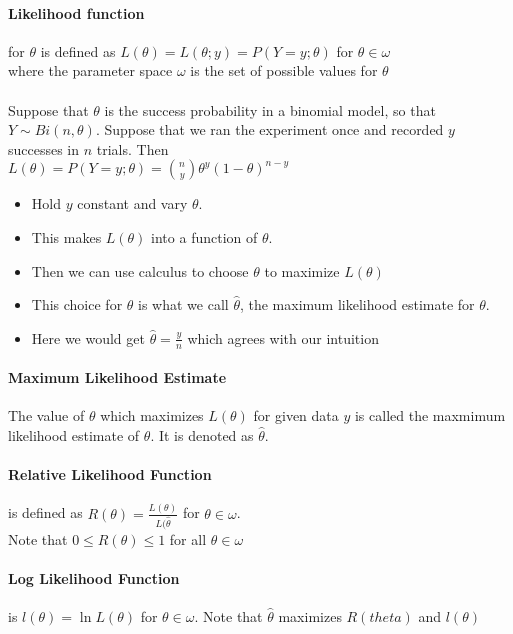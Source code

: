 \documentclass[12pt]{report}
\begin{document}
    \paragraph{Likelihood function} for $\theta$ is defined as $L(\theta) =
    L(\theta ; y) = P(Y = y ; \theta )$ for $\theta \in \omega$\\
    where the parameter space $\omega$ is the set of possible values for
    $\theta$\\
    \\
    Suppose that $\theta$ is the success probability in a binomial model, so
    that $Y \sim Bi(n, \theta )$. Suppose that we ran the experiment once and
    recorded $y$ successes in $n$ trials. Then \\
    $L(\theta ) = P(Y = y ; \theta ) = \binom{n}{y} \theta^y (1 - \theta) ^
    {n-y}$\\
    \begin{itemize}
      \item Hold $y$ constant and vary $\theta$.
      \item This makes $L(\theta)$ into a function of $\theta$.
      \item Then we can use calculus to choose $\theta$ to maximize $L(\theta)$
      \item This choice for $\theta$ is what we call $\hat{\theta}$, the
        maximum likelihood estimate for $\theta$.
      \item Here we would get $\hat{\theta} = \frac{y}{n}$ which agrees with
        our intuition
    \end{itemize}

    \paragraph{Maximum Likelihood Estimate} The value of $\theta$ which
    maximizes $L(\theta)$ for given data $y$ is called the maxmimum likelihood
    estimate of $\theta$. It is denoted as $\hat{\theta}$.

    \paragraph{Relative Likelihood Function} is defined as $R(\theta) =
    \frac{L(\theta)}{L(\hat{\theta}}$ for $\theta \in \omega$.\\
    Note that $0 \leq R(\theta) \leq 1$ for all $\theta \in \omega$

    \paragraph{Log Likelihood Function} is $l(\theta) = \ln L(\theta)$ for
      $\theta \in \omega$. Note that $\hat{\theta}$ maximizes $R(theta)$ and
      $l(\theta)$
\end{document}
